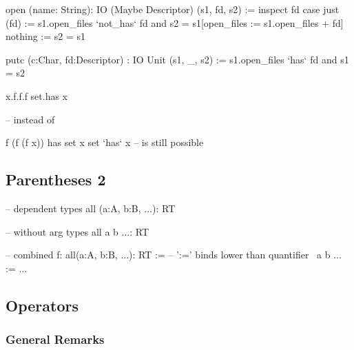 \begin{alba}
  open (name: String):
       IO (Maybe Descriptor)
          (s1, fd, s2) :=
             inspect fd case
                just (fd) :=
                   s1.open_files `not_has` fd
                   and
                   s2 = s1[open_files := s1.open_files + fd]
                nothing :=
                   s2 = s1

  putc (c:Char, fd:Descriptor)
       : IO Unit
            (s1, _, s2) :=
                s1.open_files `has` fd and
                s1 = s2
\end{alba}


\begin{alba}
  x.f.f.f                  set.has x

  -- instead of

  f (f (f x))              has set x
                           set `has` x
  -- is still possible
\end{alba}




\subsection{Parentheses 2}



\begin{alba}
  -- dependent types
  all (a:A, b:B, ...): RT

  -- without arg types
  all a b ...: RT

  -- combined
  f: all(a:A, b:B, ...): RT :=  -- ':=' binds lower than quantifier
    \ a b ... := ...
\end{alba}



\subsection{Operators}


\subsubsection{General Remarks}

